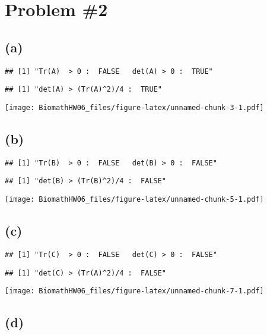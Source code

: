 \documentclass[]{article}
\begin{document}
\section{Problem \#2}\label{problem-2}

\subsection{(a)}\label{a}

\begin{verbatim}
## [1] "Tr(A)  > 0 :  FALSE   det(A) > 0 :  TRUE"
\end{verbatim}

\begin{verbatim}
## [1] "det(A) > (Tr(A)^2)/4 :  TRUE"
\end{verbatim}

\texttt{[image: BiomathHW06\_files/figure-latex/unnamed-chunk-3-1.pdf]}

\subsection{(b)}\label{b}

\begin{verbatim}
## [1] "Tr(B)  > 0 :  FALSE   det(B) > 0 :  FALSE"
\end{verbatim}

\begin{verbatim}
## [1] "det(B) > (Tr(B)^2)/4 :  FALSE"
\end{verbatim}

\texttt{[image: BiomathHW06\_files/figure-latex/unnamed-chunk-5-1.pdf]}

\subsection{(c)}\label{c}

\begin{verbatim}
## [1] "Tr(C)  > 0 :  FALSE   det(C) > 0 :  FALSE"
\end{verbatim}

\begin{verbatim}
## [1] "det(C) > (Tr(A)^2)/4 :  FALSE"
\end{verbatim}

\texttt{[image: BiomathHW06\_files/figure-latex/unnamed-chunk-7-1.pdf]}

\subsection{(d)}\label{d}
\end{document}
